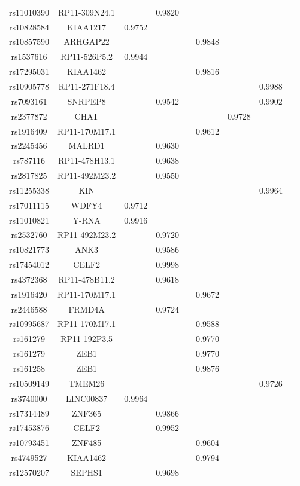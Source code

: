 \documentclass[12pt]{article}
\begin{document}
\begin{longtable}{ c c c c c c c c c}
rs11010390&RP11-309N24.1&  &0.9820 & &  & &  \\
rs10828584&KIAA1217&0.9752  & & &  & &  \\
rs10857590&ARHGAP22& & & &0.9848  & &  \\
rs1537616&RP11-526P5.2&0.9944 & & & & &  \\
rs17295031&KIAA1462&  & & &0.9816 & &  \\
rs10905778&RP11-271F18.4&  & & & & &0.9988  \\
rs7093161&SNRPEP8&  &0.9542 & & & &0.9902 \\
rs2377872&CHAT&  &  & & &0.9728 &  \\
rs1916409&RP11-170M17.1&  &  & & 0.9612 &  &  \\
rs2245456&MALRD1&  &0.9630  & &  &  &  \\
rs787116&RP11-478H13.1&  &0.9638  & &  &  &  \\
rs2817825&RP11-492M23.2&  &0.9550  & &  &  &  \\
rs11255338&KIN&  &   & &  &  &0.9964  \\
rs17011115&WDFY4&0.9712  &   & &  &  &   \\
rs11010821&Y-RNA&0.9916  &   & &  &  &   \\
rs2532760&RP11-492M23.2& &0.9720  & &  &  &   \\
rs10821773&ANK3& &0.9586  & &  &  &   \\
rs17454012&CELF2& &0.9998 & &  &  &   \\
rs4372368&RP11-478B11.2& &0.9618 & &  &  &   \\
rs1916420&RP11-170M17.1& &  & &0.9672  &  &   \\
rs2446588&FRMD4A& &0.9724  & &  &  &   \\
rs10995687&RP11-170M17.1& & & & 0.9588 &  &   \\
rs161279&RP11-192P3.5& & & & 0.9770&  &   \\
rs161279&ZEB1& & & & 0.9770&  &   \\
rs161258&ZEB1& & & & 0.9876&  &   \\
rs10509149&TMEM26& & & &  &  &0.9726  \\
rs3740000&LINC00837&0.9964 & & &  &  &  \\
rs17314489&ZNF365&  & 0.9866& &  &  &  \\
rs17453876&CELF2&  & 0.9952& &  &  &  \\
rs10793451&ZNF485&  &  & &0.9604  &  &  \\
rs4749527&KIAA1462&  &  & &0.9794 &  &  \\
rs12570207&SEPHS1&  & 0.9698 & & &  &  \\

\end{longtable}
\end{document}

